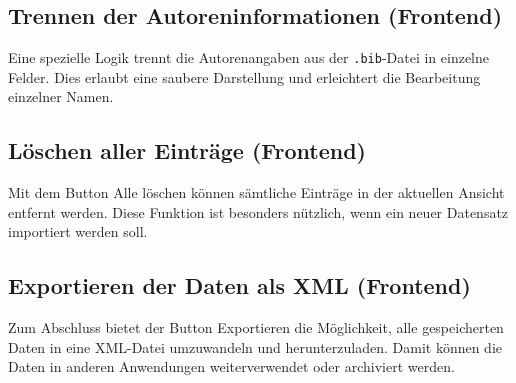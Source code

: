 \subsection{Trennen der Autoreninformationen (Frontend)}
Eine spezielle Logik trennt die Autorenangaben aus der \texttt{.bib}-Datei in einzelne Felder.
Dies erlaubt eine saubere Darstellung und erleichtert die Bearbeitung einzelner Namen.

\subsection{Löschen aller Einträge (Frontend)}
Mit dem Button \glqq Alle löschen\grqq{} können sämtliche Einträge in der aktuellen Ansicht entfernt werden.
Diese Funktion ist besonders nützlich, wenn ein neuer Datensatz importiert werden soll.

\subsection{Exportieren der Daten als XML (Frontend)}
Zum Abschluss bietet der Button \glqq Exportieren\grqq{} die Möglichkeit, 
alle gespeicherten Daten in eine XML-Datei umzuwandeln und herunterzuladen.
Damit können die Daten in anderen Anwendungen weiterverwendet oder archiviert werden.
